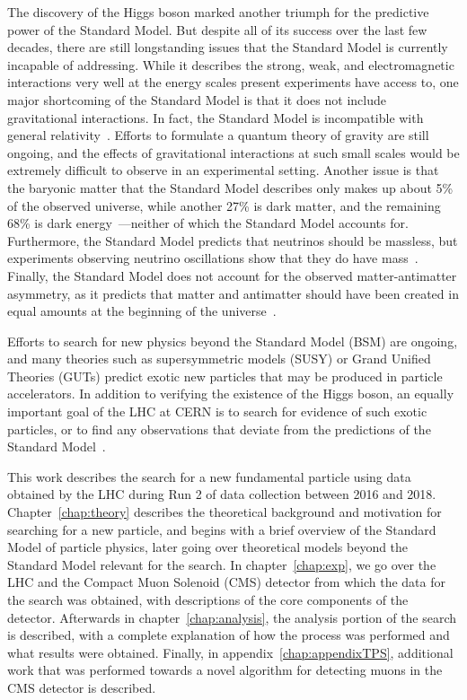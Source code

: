 The discovery of the Higgs boson marked another triumph for the predictive power of the Standard Model.
But despite all of its success over the last few decades, there are still longstanding issues that the Standard Model is currently incapable of addressing.
While it describes the strong, weak, and electromagnetic interactions very well at the energy scales present experiments have access to, one major shortcoming of the Standard Model is that it does not include gravitational interactions.
In fact, the Standard Model is incompatible with general relativity~\cite{Macias200899}.
Efforts to formulate a quantum theory of gravity are still ongoing, and the effects of gravitational interactions at such small scales would be extremely difficult to observe in an experimental setting.
Another issue is that the baryonic matter that the Standard Model describes only makes up about 5\% of the observed universe, while another 27\% is dark matter, and the remaining 68\% is dark energy~\cite{Planck2013}---neither of which the Standard Model accounts for.
Furthermore, the Standard Model predicts that neutrinos should be massless, but experiments observing neutrino oscillations show that they do have mass~\cite{Ahmad_2001}.
Finally, the Standard Model does not account for the observed matter-antimatter asymmetry, as it predicts that matter and antimatter should have been created in equal amounts at the beginning of the universe~\cite{astroParticle}.

Efforts to search for new physics beyond the Standard Model (BSM) are ongoing, and many theories such as supersymmetric models (SUSY) or Grand Unified Theories (GUTs) predict exotic new particles that may be produced in particle accelerators.
In addition to verifying the existence of the Higgs boson, an equally important goal of the LHC at CERN is to search for evidence of such exotic particles, or to find any observations that deviate from the predictions of the Standard Model~\cite{doi:10.1080/0010751031000077378,Kanti}.

This work describes the search for a new fundamental particle using data obtained by the LHC during Run 2 of data collection between 2016 and 2018.
Chapter~\ref{chap:theory} describes the theoretical background and motivation for searching for a new particle, and begins with a brief overview of the Standard Model of particle physics, later going over theoretical models beyond the Standard Model relevant for the search.
In chapter~\ref{chap:exp}, we go over the LHC and the Compact Muon Solenoid (CMS) detector from which the data for the search was obtained, with descriptions of the core components of the detector.
Afterwards in chapter~\ref{chap:analysis}, the analysis portion of the search is described, with a complete explanation of how the process was performed and what results were obtained.
Finally, in appendix~\ref{chap:appendixTPS}, additional work that was performed towards a novel algorithm for detecting muons in the CMS detector is described.
